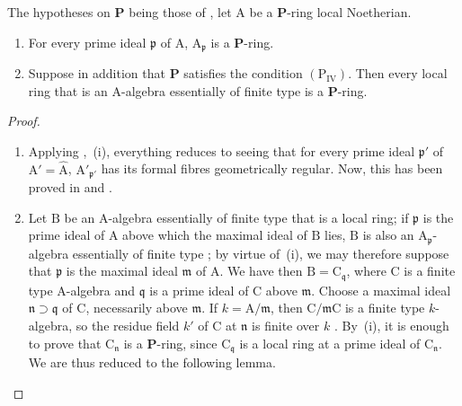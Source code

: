 \begin{theorem}[7.4.4]
\label{IV.7.4.4}
The hypotheses on $\boldsymbol{P}$ being those of , let $\mathrm{A}$ be a $\boldsymbol{P}$-ring local Noetherian.
\begin{enumerate}[label=\emph{\roman*)}]
  \item For every prime ideal $\mathfrak{p}$ of $\mathrm{A}$, $\mathrm{A}_\mathfrak{p}$ is a $\boldsymbol{P}$-ring.
  \item Suppose in addition that $\boldsymbol{P}$ satisfies the condition $(\mathrm{P_{IV}})$.
  Then every local ring that is an A-algebra essentially of finite type is a $\boldsymbol{P}$-ring.
\end{enumerate}
\end{theorem}

\begin{proof}
\begin{enumerate}[label=(\roman*)]
  \item Applying ,~(i), everything reduces to seeing that for every prime ideal $\mathfrak{p}'$ of $\mathrm{A}'=\widehat{\mathrm{A}}$, $\mathrm{A}'_{\mathfrak{p}'}$ has its formal fibres geometrically regular.
  Now, this has been proved in  and .

  \item Let $\mathrm{B}$ be an A-algebra essentially of finite type that is a local ring; if $\mathfrak{p}$ is the prime ideal of $\mathrm{A}$ above which the maximal ideal of $\mathrm{B}$ lies, $\mathrm{B}$ is also an $\mathrm{A}_\mathfrak{p}$-algebra essentially of finite type ; by virtue of~(i), we may therefore suppose that $\mathfrak{p}$ is the maximal ideal $\mathfrak{m}$ of $\mathrm{A}$.
  We have then $\mathrm{B}=\mathrm{C}_\mathfrak{q}$, where $\mathrm{C}$ is a finite type A-algebra and $\mathfrak{q}$ is a prime ideal of $\mathrm{C}$ above $\mathfrak{m}$. Choose a maximal ideal $\mathfrak{n}\supset\mathfrak{q}$ of $\mathrm{C}$, necessarily above $\mathfrak{m}$. If $k=\mathrm{A}/\mathfrak{m}$, then $\mathrm{C}/\mathfrak{m}\mathrm{C}$ is a finite type $k$-algebra, so the residue field $k'$ of $\mathrm{C}$ at $\mathfrak{n}$ is finite over $k$ . By~(i), it is enough to prove that $\mathrm{C}_\mathfrak{n}$ is a $\boldsymbol{P}$-ring, since $\mathrm{C}_\mathfrak{q}$ is a local ring at a prime ideal of $\mathrm{C}_\mathfrak{n}$. We are thus reduced to the following lemma.
\end{enumerate}
\end{proof}

